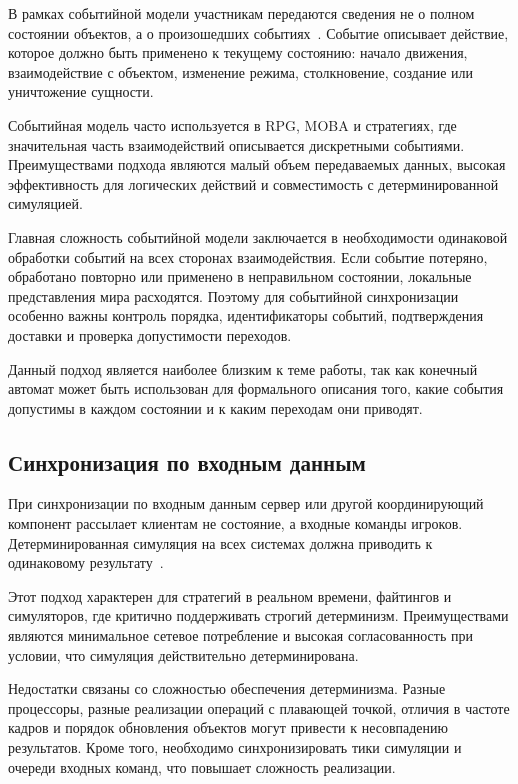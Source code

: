 В рамках событийной модели участникам передаются сведения не о полном состоянии объектов, а о произошедших событиях~\cite{GameEventSync2008}. Событие описывает действие, которое должно быть применено к текущему состоянию: начало движения, взаимодействие с объектом, изменение режима, столкновение, создание или уничтожение сущности.

Событийная модель часто используется в RPG, MOBA и стратегиях, где значительная часть взаимодействий описывается дискретными событиями. Преимуществами подхода являются малый объем передаваемых данных, высокая эффективность для логических действий и совместимость с детерминированной симуляцией.

Главная сложность событийной модели заключается в необходимости одинаковой обработки событий на всех сторонах взаимодействия. Если событие потеряно, обработано повторно или применено в неправильном состоянии, локальные представления мира расходятся. Поэтому для событийной синхронизации особенно важны контроль порядка, идентификаторы событий, подтверждения доставки и проверка допустимости переходов.

Данный подход является наиболее близким к теме работы, так как конечный автомат может быть использован для формального описания того, какие события допустимы в каждом состоянии и к каким переходам они приводят.

\subsection{Синхронизация по входным данным}

При синхронизации по входным данным сервер или другой координирующий компонент рассылает клиентам не состояние, а входные команды игроков. Детерминированная симуляция на всех системах должна приводить к одинаковому результату~\cite{photon_sync}.

Этот подход характерен для стратегий в реальном времени, файтингов и симуляторов, где критично поддерживать строгий детерминизм. Преимуществами являются минимальное сетевое потребление и высокая согласованность при условии, что симуляция действительно детерминирована.

Недостатки связаны со сложностью обеспечения детерминизма. Разные процессоры, разные реализации операций с плавающей точкой, отличия в частоте кадров и порядок обновления объектов могут привести к несовпадению результатов. Кроме того, необходимо синхронизировать тики симуляции и очереди входных команд, что повышает сложность реализации.

